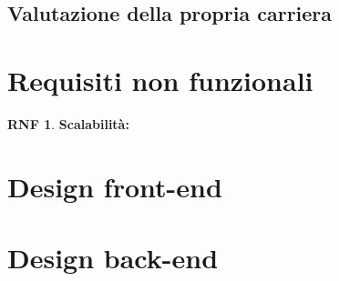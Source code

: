 \documentclass[11pt, a4paper]{article}
\theoremstyle{definition}
\newtheorem{nonfuncreq}{RNF} %
\begin{document}
\subsection*{Valutazione della propria carriera}




\section{Requisiti non funzionali}

\begin{nonfuncreq}
\label{scalabilita}
\textbf{Scalabilità:}
\end{nonfuncreq}

\section{Design front-end}

\section{Design back-end}
\end{document}

